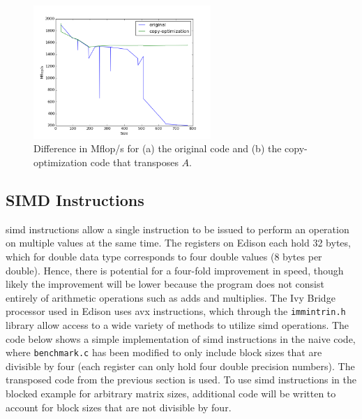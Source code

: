 \documentclass[10pt]{article}
\begin{document}
\begin{figure}[H]
\centering
\includegraphics[width=0.6\textwidth]{figures/copy-optimization.png}
\caption{Difference in Mflop/s for (a) the original code and (b) the copy-optimization code that transposes \(A\).}
\label{fig:2}
\end{figure}

\subsection{SIMD Instructions}

\gls{simd} instructions allow a single instruction to be issued to perform an operation on multiple values at the same time. The registers on Edison each hold 32 bytes, which for double data type corresponds to four double values (8 bytes per double). Hence, there is potential for a four-fold improvement in speed, though likely the improvement will be lower because the program does not consist entirely of arithmetic operations such as adds and multiplies. The Ivy Bridge processor used in Edison uses \gls{avx} instructions, which through the {\tt immintrin.h} library allow access to a wide variety of methods to utilize \gls{simd} operations. The code below shows a simple implementation of \gls{simd} instructions in the naive code, where {\tt benchmark.c} has been modified to only include block sizes that are divisible by four (each register can only hold four double precision numbers). The transposed code from the previous section is used. To use \gls{simd} instructions in the blocked example for arbitrary matrix sizes, additional code will be written to account for block sizes that are not divisible by four.
\end{document}

